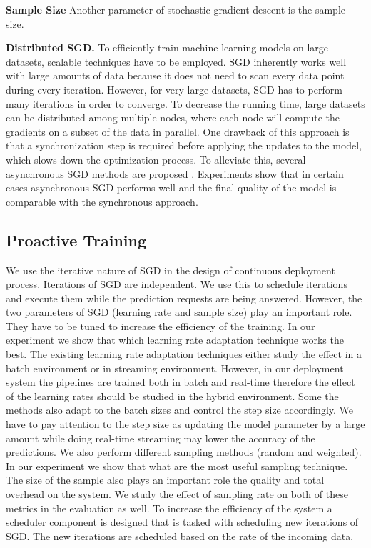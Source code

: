 \textbf{Sample Size}
Another parameter of stochastic gradient descent is the sample size.

\textbf{Distributed SGD. }
To efficiently train machine learning models on large datasets, scalable techniques have to be employed.
SGD inherently works well with large amounts of data because it does not need to scan every data point during every iteration.
However, for very large datasets, SGD has to perform many iterations in order to converge.
To decrease the running time, large datasets can be distributed among multiple nodes, where each node will compute the gradients on a subset of the data in parallel.
One drawback of this approach is that a synchronization step is required before applying the updates to the model, which slows down the optimization process.
To alleviate this, several asynchronous SGD methods are proposed \cite{recht2011hogwild, dean2012large}. 
Experiments show that in certain cases asynchronous SGD performs well and the final quality of the model is comparable with the synchronous approach.

\subsection{Proactive Training}
We use the iterative nature of SGD in the design of continuous deployment process.
Iterations of SGD are independent.
We use this to schedule iterations and execute them while the prediction requests are being answered.
However, the two parameters of SGD (learning rate and sample size) play an important role.
They have to be tuned to increase the efficiency of the training.
In our experiment we show that which learning rate adaptation technique works the best.
The existing learning rate adaptation techniques either study the effect in a batch environment or in streaming environment.
However, in our deployment system the pipelines are trained both in batch and real-time therefore the effect of the learning rates should be studied in the hybrid environment.
Some the methods also adapt to the batch sizes and control the step size accordingly.
We have to pay attention to the step size as updating the model parameter by a large amount while doing real-time streaming may lower the accuracy of the predictions.
We also perform different sampling methods (random and weighted).
In our experiment we show that what are the most useful sampling technique.
The size of the sample also plays an important role the quality and total overhead on the system.
We study the effect of sampling rate on both of these metrics in the evaluation as well.
To increase the efficiency of the system a scheduler component is designed that is tasked with scheduling new iterations of SGD.
The new iterations are scheduled based on the rate of the incoming data.


